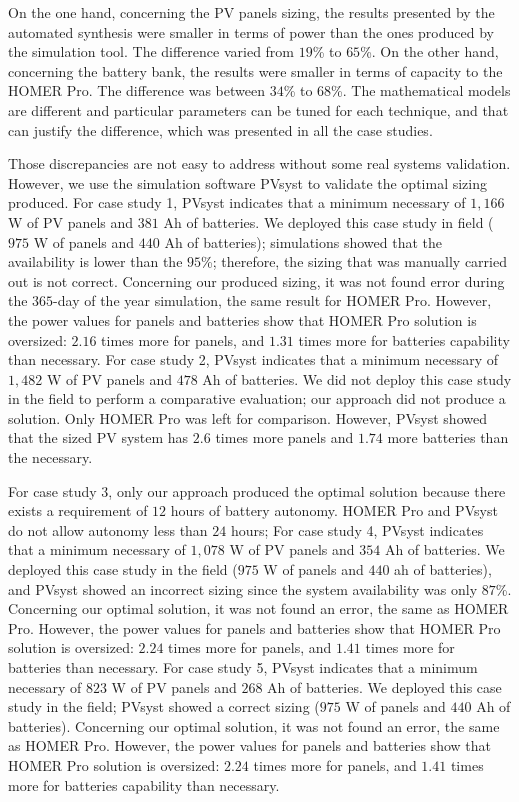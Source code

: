 \documentclass[runningheads]{llncs}
\begin{document}
On the one hand, concerning the PV panels sizing, the results presented by the automated synthesis were smaller in terms of power than the ones produced by the simulation tool. The difference varied from $19$\% to $65$\%. On the other hand, concerning the battery bank, the results were smaller in terms of capacity to the HOMER Pro. The difference was between $34$\% to $68$\%. The mathematical models are different and particular parameters can be tuned for each technique, and that can justify the difference, which was presented in all the case studies.

Those discrepancies are not easy to address without some real systems validation. However, we use the simulation software PVsyst to validate the optimal sizing produced. %
%
 For case study 1, PVsyst indicates that a minimum necessary of $1,166$ W of PV panels and $381$ Ah of batteries. We deployed this case study in field ($975$ W of panels and $440$ Ah of batteries); simulations showed that the availability is lower than the $95$\%; therefore, the sizing that was manually carried out is not correct. Concerning our produced sizing, it was not found error during the $365$-day of the year simulation, the same result for HOMER Pro. However, the power values for panels and batteries show that HOMER Pro solution is oversized: $2.16$ times more for panels, and $1.31$ times more for batteries capability than necessary.
For case study 2, PVsyst indicates that a minimum necessary of $1,482$ W of PV panels and $478$ Ah of batteries. We did not deploy this case study in the field to perform a comparative evaluation; our approach did not produce a solution. Only HOMER Pro was left for comparison. However, PVsyst showed that the sized PV system has $2.6$ times more panels and $1.74$ more batteries than the necessary.

For case study 3, only our approach produced the optimal solution because there exists a requirement of $12$ hours of battery autonomy. HOMER Pro and PVsyst do not allow autonomy less than $24$ hours;
For case study 4, PVsyst indicates that a minimum necessary of $1,078$ W of PV panels and $354$ Ah of batteries. We deployed this case study in the field ($975$ W of panels and $440$ ah of batteries), and PVsyst showed an incorrect sizing since the system availability was only $87$\%. Concerning our optimal solution, it was not found an error, the same as HOMER Pro. However, the power values for panels and batteries show that HOMER Pro solution is oversized: $2.24$ times more for panels, and $1.41$ times more for batteries than necessary.
For case study 5, PVsyst indicates that a minimum necessary of $823$ W of PV panels and $268$ Ah of batteries. We deployed this case study in the field; PVsyst showed a correct sizing ($975$ W of panels and $440$ Ah of batteries). Concerning our optimal solution, it was not found an error, the same as HOMER Pro. However, the power values for panels and batteries show that HOMER Pro solution is oversized: $2.24$ times more for panels, and $1.41$ times more for batteries capability than necessary.
\end{document}
